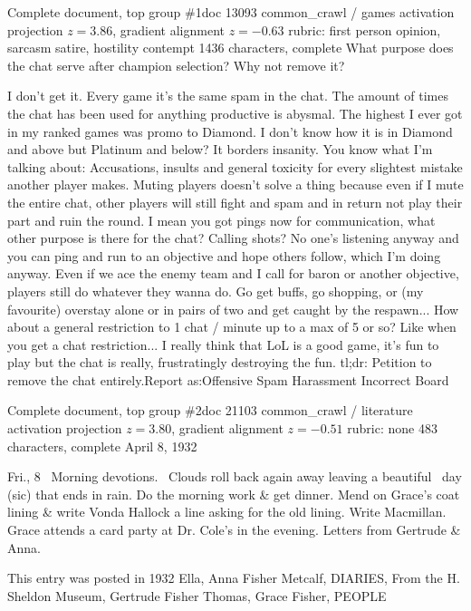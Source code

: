 \begin{docbox}{Complete document, top group \#1}{doc 13093 \textbullet{} common\_crawl / games \textbullet{} activation projection $z=3.86$, gradient alignment $z=-0.63$ \textbullet{} rubric: first person opinion, sarcasm satire, hostility contempt \textbullet{} 1436 characters, complete}
What purpose does the chat serve after champion selection? Why not remove it?\par I don't get it. Every game it's the same spam in the chat. The amount of times the chat has been used for anything productive is abysmal. The highest I ever got in my ranked games was promo to Diamond. I don't know how it is in Diamond and above but Platinum and below? It borders insanity. You know what I'm talking about: Accusations, insults and general toxicity for every slightest mistake another player makes. Muting players doesn't solve a thing because even if I mute the entire chat, other players will still fight and spam and in return not play their part and ruin the round. I mean you got pings now for communication, what other purpose is there for the chat? Calling shots? No one's listening anyway and you can ping and run to an objective and hope others follow, which I'm doing anyway. Even if we ace the enemy team and I call for baron or another objective, players still do whatever they wanna do. Go get buffs, go shopping, or (my favourite) overstay alone or in pairs of two and get caught by the respawn... How about a general restriction to 1 chat / minute up to a max of 5 or so? Like when you get a chat restriction... I really think that LoL is a good game, it's fun to play but the chat is really, frustratingly destroying the fun. tl;dr: Petition to remove the chat entirely.\newline Report as:\newline Offensive Spam Harassment Incorrect Board
\end{docbox}

\begin{docbox}{Complete document, top group \#2}{doc 21103 \textbullet{} common\_crawl / literature \textbullet{} activation projection $z=3.80$, gradient alignment $z=-0.51$ \textbullet{} rubric: none \textbullet{} 483 characters, complete}
April 8, 1932\par Fri., 8~ Morning devotions.~ Clouds roll back again away leaving a beautiful~ day (sic) that ends in rain. Do the morning work \& get dinner. Mend on Grace’s coat lining \& write Vonda Hallock a line asking for the old lining. Write Macmillan. Grace attends a card party at Dr. Cole’s in the evening. Letters from Gertrude \& Anna.\par This entry was posted in 1932 Ella, Anna Fisher Metcalf, DIARIES, From the H. Sheldon Museum, Gertrude Fisher Thomas, Grace Fisher, PEOPLE
\end{docbox}

